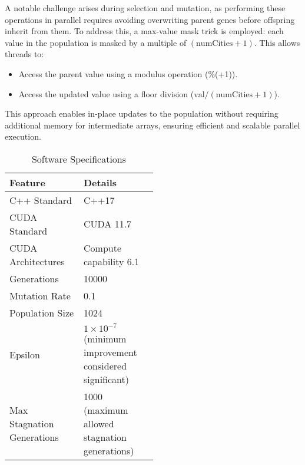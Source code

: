 \documentclass[conference]{IEEEtran}
\begin{document}
A notable challenge arises during selection and mutation, as performing these operations in parallel requires avoiding overwriting parent genes before offspring inherit from them. To address this, a max-value mask trick is employed: each value in the population is masked by a multiple of $(\text{numCities} + 1)$. This allows threads to:
\begin{itemize}
    \item Access the parent value using a modulus operation (\%(+1)).
    \item Access the updated value using a floor division ($\text{val}/(\text{numCities}+1) $).
\end{itemize}
This approach enables in-place updates to the population without requiring additional memory for intermediate arrays, ensuring efficient and scalable parallel execution.


\begin{table}[h!]
    \centering
    \caption{Software Specifications}
    \begin{tabular}{|l|p{0.5\linewidth}|}
        \hline
        \textbf{Feature}           & \textbf{Details}                                                \\ \hline
        C++ Standard               & C++17                                                           \\ \hline
        CUDA Standard              & CUDA 11.7                                                       \\ \hline
        CUDA Architectures         & Compute capability 6.1                                          \\ \hline
        Generations                & 10000                                                           \\ \hline
        Mutation Rate              & 0.1                                                             \\ \hline
        Population Size            & 1024                                                            \\ \hline
        Epsilon                    & $1 \times 10^{-7}$ (minimum improvement considered significant) \\ \hline
        Max Stagnation Generations & 1000 (maximum allowed stagnation generations)                   \\ \hline
    \end{tabular}
    \label{tab:software_specs}
\end{table}
\end{document}
